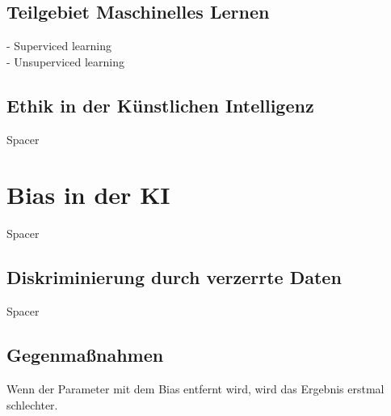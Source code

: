 \begin{onehalfspace}
        \subsection{Teilgebiet Maschinelles Lernen}
        \label{subsubsec:teilgebietML}
            -   Superviced learning \\
            -   Unsuperviced learning \\

        \subsection{Ethik in der Künstlichen Intelligenz}
        \label{subsubsec:ethikinderKI}
            Spacer

        \section{Bias in der \ac*{KI}}
        \label{subsec:KIundbias}
            Spacer

        \subsection{Diskriminierung durch verzerrte Daten}
        \label{subsubsec:diskriminierungdurchverzerrung}
            Spacer

        \subsection{Gegenma{\ss}nahmen}
        \label{subsubsec:gegenmassnahmen}
            Wenn der Parameter mit dem Bias entfernt wird, wird das Ergebnis erstmal schlechter. 
            
    \newpage
    \end{onehalfspace}